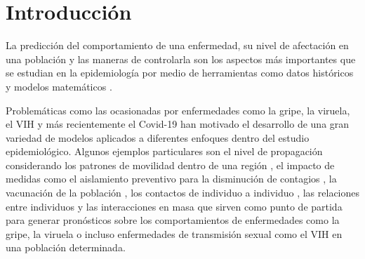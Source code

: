 \chapter{Introducción}\label{ch;Introduccion}

La predicción del comportamiento de una enfermedad, su nivel de afectación en una población y las maneras de controlarla son los aspectos más importantes que se estudian en la epidemiología por medio de herramientas como datos históricos y modelos matemáticos \cite{diego2010}.

Problemáticas como las ocasionadas por enfermedades como la gripe, la viruela, el VIH y más recientemente el Covid-19 han motivado el desarrollo de una gran variedad de modelos aplicados a diferentes enfoques dentro del estudio epidemiológico. Algunos ejemplos particulares son el nivel de propagación considerando los patrones de movilidad dentro de una región \cite{colaGNN, epidemiologicalNeuralNetwork}, el impacto de medidas como el aislamiento preventivo para la disminución de contagios \cite{stayHome}, la vacunación de la población \cite{shortHistory}, los contactos de individuo a individuo \cite{heterogeneousPopulation}, las relaciones entre individuos \cite{redesComplejas} y las interacciones en masa \cite{combiningGraph, transfer2021} que sirven como punto de partida para generar pronósticos sobre los comportamientos de enfermedades como la gripe, la viruela o incluso enfermedades de transmisión sexual como el VIH en una población determinada.

